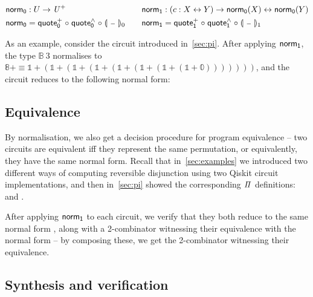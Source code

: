 \begin{definition}
  \begin{gather*}
    \begin{aligned}
      \normt_{0} & : U \to \UPlus                                            \\
      \normt_{0} & = \quotep_{0} \comp \quoteh_{0} \comp \gdenot{\blank}_{0}
    \end{aligned}
    \qquad
    \begin{aligned}
      \normt_{1} & : (c : X \iso Y) \to \normt_{0}(X) \iso \normt_{0}(Y)     \\
      \normt_{1} & = \quotep_{1} \comp \quoteh_{1} \comp \gdenot{\blank}_{1}
    \end{aligned}
  \end{gather*}
\end{definition}

As an example, consider the  circuit introduced in~\cref{sec:pi}. After applying $\normt_{1}$, the
type $\mathbb{B}\ 3$ normalises to $\mathbb{8}+ \equiv \mathbb{1} + (\mathbb{1} + (\mathbb{1} + (\mathbb{1} +
  (\mathbb{1} + (\mathbb{1} + (\mathbb{1} + (\mathbb{1} + \mathbb{0})))))))$, and the circuit reduces to the following
normal form:

\medskip
\resetnormtwo{}

\subsection{Equivalence}

By normalisation, we also get a decision procedure for program equivalence -- two circuits are equivalent iff they
represent the same permutation, or equivalently, they have the same normal form. Recall that in~\cref{sec:examples} we
introduced two different ways of computing reversible disjunction using two Qiskit circuit implementations, and then
in~\cref{sec:pi} showed the corresponding $\mathit{\Pi}$ definitions:  and . 

After applying $\normt_{1}$ to each circuit, we verify that they both reduce to the same normal form
, along with a 2-combinator witnessing their equivalence with the normal form -- by composing
these, we get the 2-combinator witnessing their equivalence.

\subsection{Synthesis and verification}

